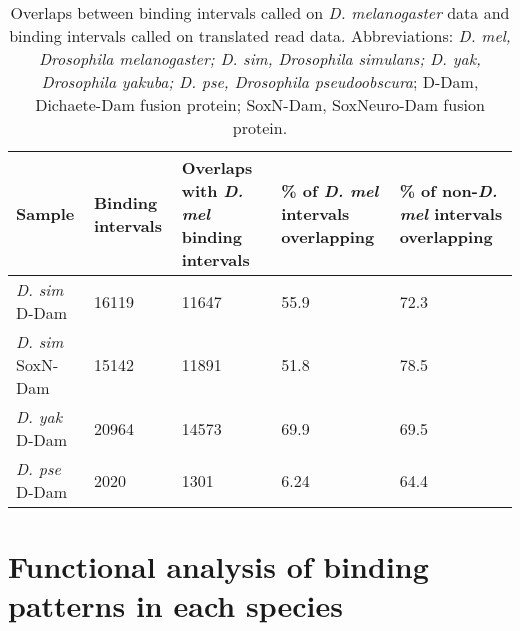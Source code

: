\begin{table}[h]
\begin{tabular}{|l|p{2cm}|p{2.5cm}|p{2.5cm}|p{2.5cm}|}
\hline
\textbf{Sample}          & \textbf{Binding intervals} & \textbf{Overlaps with \emph{D. mel} binding intervals} & \textbf{\% of \emph{D. mel} intervals overlapping} & \textbf{\% of non-\emph{D. mel} intervals overlapping} \\ \hline
\emph{D. sim} D-Dam    & 16119             & 11647                                  & 55.9                               & 72.3                                   \\ \hline
\emph{D. sim} SoxN-Dam & 15142             & 11891                                  & 51.8                               & 78.5                                   \\ \hline
\emph{D. yak} D-Dam    & 20964             & 14573                                  & 69.9                               & 69.5                                   \\ \hline
\emph{D. pse} D-Dam    & 2020              & 1301                                   & 6.24                               & 64.4                                   \\ \hline
\end{tabular}
\caption{Overlaps between binding intervals called on \emph{D. melanogaster} data and binding intervals called on translated read data. Abbreviations: \emph{D. mel, Drosophila melanogaster; D. sim, Drosophila simulans; D. yak, Drosophila yakuba; D. pse, Drosophila pseudoobscura}; D-Dam, Dichaete-Dam fusion protein; SoxN-Dam, SoxNeuro-Dam fusion protein.}
\label{Table 4.4}
\end{table}

\section{Functional analysis of binding patterns in each species}
